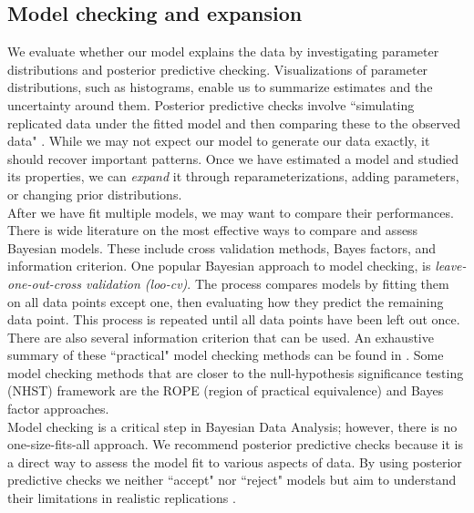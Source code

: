 \documentclass{article}
\begin{document}
\subsection{Model checking and expansion}
We evaluate whether our model explains the data by investigating parameter distributions and posterior predictive checking.  Visualizations of parameter distributions, such as histograms, enable us to summarize estimates and the uncertainty around them.  Posterior predictive checks involve ``simulating replicated data under the fitted model and then comparing these to the observed data" \cite[p. ~158]{gelman2006data}.  While we may not expect our model to generate our data exactly, it should recover important patterns.  Once we have estimated a model and studied its properties, we can \emph{expand} it through reparameterizations, adding parameters, or changing prior distributions. \\
After we have fit multiple models, we may want to compare their performances. There is wide literature on the most effective ways to compare and assess Bayesian models. These include cross validation methods, Bayes factors, and information criterion. One popular Bayesian approach to model checking, is \textit{leave-one-out-cross validation (loo-cv)}. The process compares models by fitting them on all data points except one, then evaluating how they predict the remaining data point. This process is repeated until all data points have been left out once. There are also several information criterion that can be used. An exhaustive summary of these ``practical" model checking methods can be found in . Some model checking methods that are closer to the null-hypothesis significance testing (NHST) framework are the ROPE (region of practical equivalence)\cite{kruschke2014doing} and Bayes factor \cite{rouder2009bayesian} approaches. \\
Model checking is a critical step in Bayesian Data Analysis; however, there is no one-size-fits-all approach.  We recommend posterior predictive checks because it is a direct way to assess the model fit to various aspects of data. By using posterior predictive checks we neither ``accept" nor ``reject" models but aim to understand their limitations in realistic replications \cite{gelman2014bayesian}.
\end{document}
